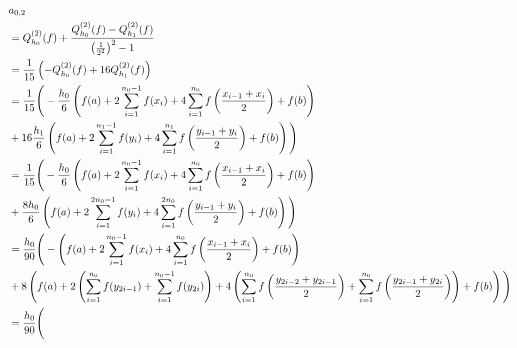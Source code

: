 \begin{align*}
    & a_{0,2} \\
    & = Q_{h_0}^{(2)}(f) +
        \frac
        {Q_{h_0}^{(2)}(f) - Q_{h_1}^{(2)}(f)}
        {\pbraces{\frac{1}{2^2}}^2 - 1} \\
    & = \frac{1}{15}
        \pbraces
        {
            - Q_{h_0}^{(2)}(f)
            + 16 Q_{h_1}^{(2)}(f)
        } \\
    & = \frac{1}{15}
        \Bigg (
            - \frac{h_0}{6}
            \pbraces
            {
                f(a) +
                2 \sum_{i=1}^{n_0 - 1} f(x_i) +
                4 \sum_{i=1}^{n_0} f \pbraces{\frac{x_{i-1} + x_i}{2}} +
                f(b)
            } \\
    & +
            16 \frac{h_1}{6}
            \pbraces
            {
                f(a) +
                2 \sum_{i=1}^{n_1 - 1} f(y_i) +
                4 \sum_{i=1}^{n_1} f \pbraces{\frac{y_{i-1} + y_i}{2}} +
                f(b)
            }
        \Bigg ) \\
    & = \frac{1}{15}
        \Bigg (
            - \frac{h_0}{6}
            \pbraces
            {
                f(a) +
                2 \sum_{i=1}^{n_0 - 1} f(x_i) +
                4 \sum_{i=1}^{n_0} f \pbraces{\frac{x_{i-1} + x_i}{2}} +
                f(b)
            } \\
    & +
            \frac{8 h_0}{6}
            \pbraces
            {
                f(a) +
                2 \sum_{i=1}^{2 n_0 - 1} f(y_i) +
                4 \sum_{i=1}^{2 n_0} f \pbraces{\frac{y_{i-1} + y_i}{2}} +
                f(b)
            }
        \Bigg ) \\
    & = \frac{h_0}{90}
        \Bigg (
            - \pbraces
            {
                f(a) +
                2 \sum_{i=1}^{n_0 - 1} f(x_i) +
                4 \sum_{i=1}^{n_0} f \pbraces{\frac{x_{i-1} + x_i}{2}} +
                f(b)
            } \\
    & +
            8 \pbraces
            {
                f(a) +
                2 \pbraces
                {
                    \sum_{i=1}^{n_0} f(y_{2i-1}) +
                    \sum_{i=1}^{n_0 - 1} f(y_{2i})
                } +
                4 \pbraces
                {
                    \sum_{i=1}^{n_0} f \pbraces{\frac{y_{2i-2} + y_{2i-1}}{2}} +
                    \sum_{i=1}^{n_0} f \pbraces{\frac{y_{2i-1} + y_{2i}}{2}}
                } +
                f(b)
            }
        \Bigg ) \\
    & = \frac{h_0}{90}
        \Bigg (

\end{align*}
